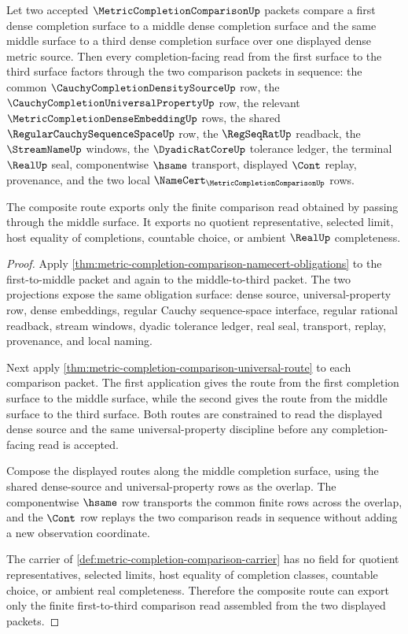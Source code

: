 \begin{theorem}
\label{thm:metric-completion-comparison-triangle}
Let two accepted $\MetricCompletionComparisonUp$ packets compare a first dense completion surface to a middle dense completion surface and the same middle surface to a third dense completion surface over one displayed dense metric source. Then every completion-facing read from the first surface to the third surface factors through the two comparison packets in sequence: the common $\CauchyCompletionDensitySourceUp$ row, the $\CauchyCompletionUniversalPropertyUp$ row, the relevant $\MetricCompletionDenseEmbeddingUp$ rows, the shared $\RegularCauchySequenceSpaceUp$ row, the $\RegSeqRatUp$ readback, the $\StreamNameUp$ windows, the $\DyadicRatCoreUp$ tolerance ledger, the terminal $\RealUp$ seal, componentwise $\hsame$ transport, displayed $\Cont$ replay, provenance, and the two local $\NameCert_{\MetricCompletionComparisonUp}$ rows.

The composite route exports only the finite comparison read obtained by passing through the middle surface. It exports no quotient representative, selected limit, host equality of completions, countable choice, or ambient $\RealUp$ completeness.
\end{theorem}
\begin{proof}
Apply \autoref{thm:metric-completion-comparison-namecert-obligations} to the first-to-middle packet and again to the middle-to-third packet. The two projections expose the same obligation surface: dense source, universal-property row, dense embeddings, regular Cauchy sequence-space interface, regular rational readback, stream windows, dyadic tolerance ledger, real seal, transport, replay, provenance, and local naming.

Next apply \autoref{thm:metric-completion-comparison-universal-route} to each comparison packet. The first application gives the route from the first completion surface to the middle surface, while the second gives the route from the middle surface to the third surface. Both routes are constrained to read the displayed dense source and the same universal-property discipline before any completion-facing read is accepted.

Compose the displayed routes along the middle completion surface, using the shared dense-source and universal-property rows as the overlap. The componentwise $\hsame$ row transports the common finite rows across the overlap, and the $\Cont$ row replays the two comparison reads in sequence without adding a new observation coordinate.

The carrier of \autoref{def:metric-completion-comparison-carrier} has no field for quotient representatives, selected limits, host equality of completion classes, countable choice, or ambient real completeness. Therefore the composite route can export only the finite first-to-third comparison read assembled from the two displayed packets.
\end{proof}

